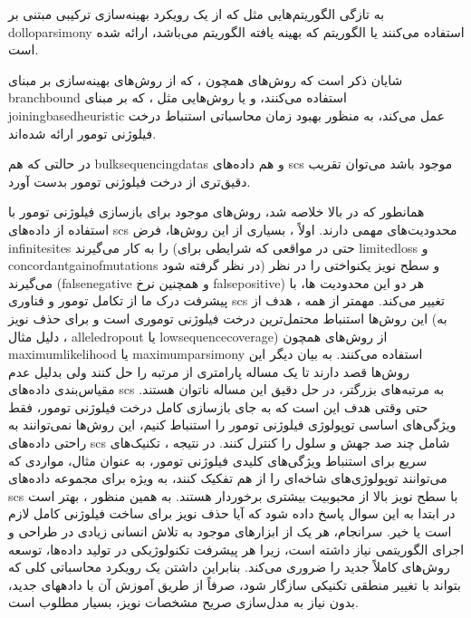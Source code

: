 به تازگی الگوریتم‌هایی مثل  که از یک رویکرد بهینه‌سازی ترکیبی مبتنی بر \gls{dolloparsimony} استفاده می‌کنند یا الگوریتم   که بهینه یافته الگوریتم  می‌باشد، ارائه شده است. \cite{el2018sphyr, zafar2019siclonefit}

شایان ذکر است که روش‌های همچون  ، که از روش‌های بهینه‌سازی بر مبنای \gls{branchbound} استفاده می‌کنند، و یا روش‌هایی مثل ، که بر مبنای \gls{joiningbasedheuristic} عمل می‌کند، به منظور بهبود زمان محاسباتی استنباط درخت فیلوژنی تومور ارائه شده‌اند. \cite{sadeqi2020phiscs, wu2020accurate}

در حالتی که هم \glspl{bulksequencingdata} و هم داده‌های \gls{scs} موجود باشد می‌توان تقریب دقیق‌تری از درخت فیلوژنی  تومور بدست آورد. \cite{malikic2019integrative, malikic2019phiscs}

همانطور که در بالا خلاصه شد، روش‌های موجود برای بازسازی فیلوژنی تومور با استفاده از داده‌های \gls{scs} محدودیت‌های مهمی دارند. اولاً ، بسیاری از این روش‌ها، فرض \gls{infinitesites} را به کار می‌گیرند (حتی در مواقعی که شرایطی برای \gls{limitedloss} و \gls{concordantgainofmutations}  در نظر گرفته شود) و سطح نویز یکنواختی را در نظر می‌گیرند (\gls{falsenegative} و همچنین نرخ \gls{falsepositive})  هر دو این محدودیت ها، با پیشرفت درک ما از تکامل تومور و فناوری \gls{scs}  تغییر می‌کند. مهمتر از همه ، هدف از این روش‌ها استنباط محتمل‌ترین درخت فیلوژنی توموری است و برای حذف نویز (به دلیل مثال ، \gls{alleledropout} یا \gls{lowsequencecoverage}) از روش‌های همچون \gls{maximumlikelihood} یا \gls{maximumparsimony} استفاده می‌کنند. به بیان دیگر این روش‌ها قصد دارند تا یک مساله پارامتری از مرتبه  را حل کنند ولی بدلیل  عدم مقیاس‌بندی داده‌های \gls{scs} به مرتبه‌های بزرگتر، در حل دقیق این مساله ناتوان هستند. حتی وقتی هدف این است که به جای بازسازی کامل درخت فیلوژنی تومور، فقط ویژگی‌های اساسی توپولوژی فیلوژنی تومور را استنباط کنیم، این روش‌ها نمی‌توانند به راحتی داده‌های \gls{scs} شامل چند صد جهش و سلول را کنترل کنند. در نتیجه ، تکنیک‌های سریع برای استنباط ویژگی‌های کلیدی فیلوژنی تومور، به عنوان مثال، مواردی که می‌توانند توپولوژی‌های شاخه‌ای را از هم تفکیک کنند، به ویژه برای مجموعه داده‌های \gls{scs} با سطح نویز بالا از محبوبیت بیشتری برخوردار هستند. به همین منظور ، بهتر است در ابتدا به این سوال پاسخ داده شود که آیا حذف نویز  برای ساخت فیلوژنی کامل لازم است یا خیر. سرانجام، هر یک از ابزارهای موجود به تلاش انسانی زیادی در طراحی و اجرای الگوریتمی نیاز داشته است، زیرا هر پیشرفت تکنولوژیکی در تولید داده‌ها، توسعه روش‌های کاملاً جدید را ضروری می‌کند. بنابراین داشتن یک رویکرد محاسباتی کلی که بتواند با تغییر منطقی تکنیکی سازگار شود، صرفاً از طریق آموزش آن با دادههای جدید، بدون نیاز به مدل‌سازی صریح مشخصات نویز، بسیار مطلوب است.



